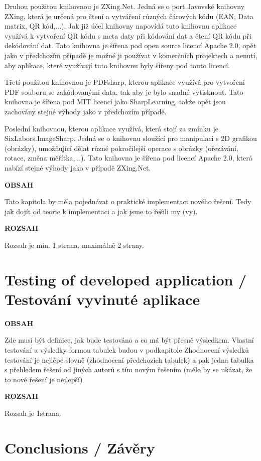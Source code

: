 \documentclass[conference]{IEEEtran}
\begin{document}
Druhou použitou knihovnou je ZXing.Net. Jedná se o port Javovské knihovny ZXing, která je určená pro čtení a vytváření různých čárových kódu (EAN, Data matrix, QR kód,...). Jak již účel knihovny napovídá tuto knihovnu aplikace využívá k vytvoření QR kódu s meta daty při kódování dat a čtení QR kódu při dekódování dat. Tato knihovna je šířena pod open source licencí Apache 2.0, opět jako v předchozím případě je možné ji používat v komerčních projektech a nenutí, aby aplikace, které využívají tuto knihovnu byly šířeny pod touto licencí.


Třetí použitou knihovnou je PDFsharp, kterou aplikace využívá pro vytvoření PDF souboru se zakódovanými data, tak aby je bylo snadné vytisknout. Tato knihovna je šířena pod MIT licencí jako SharpLearning, takže opět jsou zachovány stejné výhody jako v předchozím případě.

Poslední knihovnou, kterou aplikace využívá, která stojí za zmínku je SixLabors.ImageSharp. Jedná se o knihovnu sloužící pro manipulaci s 2D grafikou (obrázky), umožňující dělat různé pokročilejší operace s obrázky (ořezávání, rotace, změna měřítka,...). Tato knihovna je šířena pod licencí Apache 2.0, která nabízí stejné výhody jako v případě ZXing.Net. 

\textbf{OBSAH}

Tato kapitola by měla pojednávat o praktické implementaci nového řešení. Tedy jak dojít od teorie k implementaci a jak jsme to řešili my (vy).

\textbf{ROZSAH}

Rozsah je min. 1 strana, maximálně 2 strany.

\section{Testing of developed application / Testování vyvinuté aplikace}

\textbf{OBSAH}

Zde musí být definice, jak bude testováno a co má být přesně výsledkem.
Vlastní testování a výsledky formou tabulek budou v podkapitole
Zhodnocení výsledků testování je nejlépe slovně (zhodnocení předchozích tabulek) a pak jedna tabulka s přehledem řešení od jiných autorů s tím novým řešením (mělo by se ukázat, že to nové řešení je nejlepší)

\textbf{ROZSAH}

Rozsah je 1strana.

\section{Conclusions / Závěry}
\end{document}
